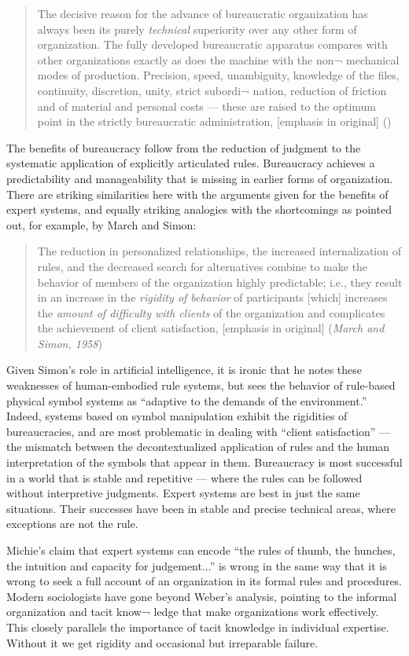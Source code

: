 \documentclass[12pt]{article}
\def\bq{\begin{quote}}
\def\eq{\end{quote}}
\begin{document}
\bq
The decisive reason for the advance of bureaucratic organization has always been its purely {\it technical} superiority over any other form of organization. The fully developed bureaucratic apparatus compares with other organizations exactly as does the machine with the non¬ mechanical modes of production. Precision, speed, unambiguity, knowledge of the files, continuity, discretion, unity, strict subordi¬ nation, reduction of friction and of material and personal costs --- these are raised to the optimum point in the strictly bureaucratic administration, [emphasis in original] ({\it \cite{weber1968}})
\eq

The benefits of bureaucracy follow from the reduction of judgment to the systematic application of explicitly articulated rules. Bureaucracy achieves a predictability and manageability that is missing in earlier forms of organization. There are striking similarities here with the arguments given for the benefits of expert systems, and equally striking analogies with the shortcomings as pointed out, for example, by March and Simon:

\bq
The reduction in personalized relationships, the increased internalization of rules, and the decreased search for alternatives combine to make the behavior of members of the organization highly predictable; i.e., they result in an increase in the {\it rigidity of behavior} of participants [which] increases the {\it amount of difficulty with clients} of the organization and complicates the achievement of client satisfaction, [emphasis in original] ({\it March and Simon, 1958})
\eq

Given Simon's role in artificial intelligence, it is ironic that he notes these weaknesses of human-embodied rule systems, but sees the behavior of rule-based physical symbol systems as ``adaptive to the demands of the environment.'' Indeed, systems based on symbol manipulation exhibit the rigidities of bureaucracies, and are most problematic in dealing with ``client satisfaction'' --- the mismatch between the decontextualized application of rules and the human interpretation of the symbols that appear in them. Bureaucracy is most successful in a world that is stable and repetitive --- where the rules can be followed without interpretive judgments. Expert systems are best in just the same situations. Their successes have been in stable and precise technical areas, where exceptions are not the rule.

Michie's claim that expert systems can encode ``the rules of thumb, the hunches, the intuition and capacity for judgement...'' is wrong in the same way that it is wrong to seek a full account of an organization in its formal rules and procedures. Modern sociologists have gone beyond Weber's analysis, pointing to the informal organization and tacit know¬ ledge that make organizations work effectively. This closely parallels the importance of tacit knowledge in individual expertise. Without it we get rigidity and occasional but irreparable failure.
\end{document}
